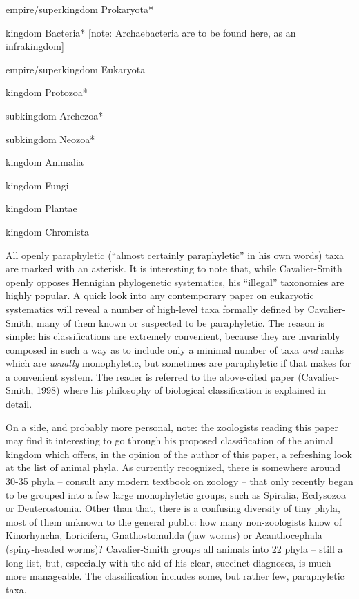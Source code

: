 \begin{artengenv}
\begin{longitemize}
\item empire/superkingdom Prokaryota*
\begin{longitemize}
\item kingdom Bacteria* [note: Archaebacteria are to be found here, as an infrakingdom]
\end{longitemize}
\item empire/superkingdom Eukaryota
\begin{longitemize}
\item kingdom Protozoa*
\begin{longitemize}
\item subkingdom Archezoa*
\item subkingdom Neozoa*
\end{longitemize}
\item kingdom Animalia
\item kingdom Fungi
\item kingdom Plantae
\item kingdom Chromista
\end{longitemize}
\end{longitemize}
All openly paraphyletic (``almost certainly paraphyletic'' in his own words) taxa are marked with an asterisk. It is
interesting to note that, while Cavalier-Smith openly opposes Hennigian phylogenetic systematics, his ``illegal''
taxonomies are highly popular. A quick look into any contemporary paper on eukaryotic systematics will reveal a number
of high-level taxa formally defined by Cavalier-Smith, many of them known or suspected to be paraphyletic. The reason
is simple: his classifications are extremely convenient, because they are invariably composed in such a way as to
include only a minimal number of taxa \textit{and} ranks which are \textit{usually }monophyletic, but sometimes are
paraphyletic if that makes for a convenient system. The reader is referred to the above-cited paper (Cavalier-Smith,
1998) where his philosophy of biological classification is explained in detail.

On a side, and probably more personal, note: the zoologists reading this paper may find it interesting to go through his
proposed classification of the animal kingdom
\parencite[pp.235–237]{cavalier-smith_revised_1998}
which offers,
in the opinion of the author of this paper, a refreshing look at the list of animal phyla. As currently recognized,
there is somewhere around 30-35 phyla -- consult any modern textbook on zoology -- that only recently began to be grouped
into a few large monophyletic groups, such as Spiralia, Ecdysozoa or Deuterostomia. Other than that, there is a
confusing diversity of tiny phyla, most of them unknown to the general public: how many non-zoologists know of
Kinorhyncha, Loricifera, Gnathostomulida (jaw worms) or Acanthocephala (spiny-headed worms)? Cavalier-Smith groups all
animals into 22 phyla -- still a long list, but, especially with the aid of his clear, succinct diagnoses, is much more
manageable. The classification includes some, but rather few, paraphyletic taxa.


\end{artengenv}
